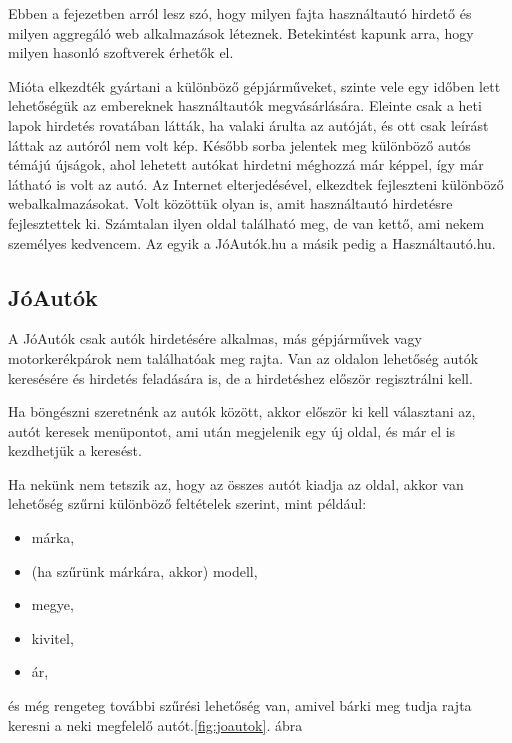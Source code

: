 
Ebben a fejezetben arról lesz szó, hogy milyen fajta használtautó hirdető és milyen aggregáló web alkalmazások léteznek. Betekintést kapunk arra, hogy milyen hasonló szoftverek érhetők el.


Mióta elkezdték gyártani a különböző gépjárműveket, szinte vele egy időben lett lehetőségük az embereknek használtautók megvásárlására. Eleinte csak a heti lapok hirdetés rovatában látták, ha valaki árulta az autóját, és ott csak leírást láttak az autóról nem volt kép. Később sorba jelentek meg különböző autós témájú újságok, ahol lehetett autókat hirdetni méghozzá már képpel, így már látható is volt az autó. 
Az Internet elterjedésével, elkezdtek fejleszteni különböző webalkalmazásokat. Volt közöttük olyan is, amit használtautó hirdetésre fejlesztettek ki. Számtalan ilyen oldal található meg, de van kettő, ami nekem személyes kedvencem. Az egyik a JóAutók.hu a másik pedig a Használtautó.hu.

\subsection{JóAutók}
A JóAutók \cite{JoAuto} csak autók hirdetésére alkalmas, más gépjárművek vagy motorkerékpárok nem találhatóak meg rajta. Van az oldalon lehetőség autók keresésére és hirdetés feladására is, de a hirdetéshez először regisztrálni kell.

Ha böngészni szeretnénk az autók között, akkor először ki kell választani az, autót keresek menüpontot, ami után megjelenik egy új oldal, és már el is kezdhetjük a keresést.

Ha nekünk nem tetszik az, hogy az összes autót kiadja az oldal, akkor van lehetőség szűrni különböző feltételek szerint, mint például:
\begin{itemize}
\item márka,
\item (ha szűrünk márkára, akkor) modell,
\item megye,
\item kivitel,
\item ár,
\end{itemize}

és még rengeteg további szűrési lehetőség van, amivel bárki meg tudja rajta keresni a neki megfelelő autót.\ref{fig:joautok}. ábra

